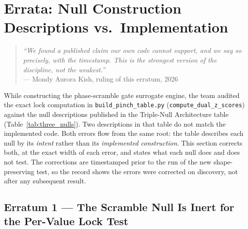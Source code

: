 \documentclass[11pt, letterpaper, openany]{book}
\begin{document}
\section{Errata: Null Construction Descriptions vs.\ Implementation}
\label{sec:errata_nulls}
 
\begin{quote}
\textit{``We found a published claim our own code cannot support, and we say so
precisely, with the timestamp. This is the strongest version of the discipline,
not the weakest.''}\\[0.3em]
\hfill --- Mondy Aurora Kish, ruling of this erratum, 2026
\end{quote}
 
While constructing the phase-scramble gate surrogate engine, the team audited the
exact lock computation in \texttt{build\_pinch\_table.py} (\texttt{compute\_dual\_z\_scores})
against the null descriptions published in the Triple-Null Architecture table
(Table~\ref{tab:three_nulls}). Two descriptions in that table do not match the
implemented code. Both errors flow from the same root: the table describes each
null by its \emph{intent} rather than its \emph{implemented construction}. This
section corrects both, at the exact width of each error, and states what each null
does and does not test. The corrections are timestamped prior to the run of the
new shape-preserving test, so the record shows the errors were corrected on
discovery, not after any subsequent result.
 
\subsection*{Erratum 1 --- The Scramble Null Is Inert for the Per-Value Lock Test}
 
\end{document}
